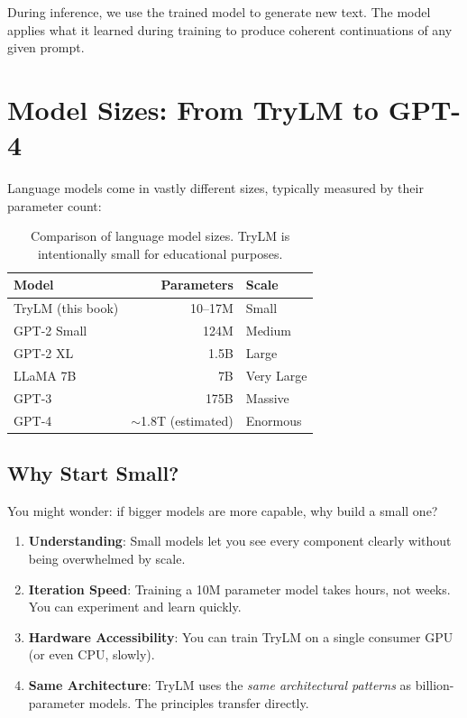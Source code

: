 During inference, we use the trained model to generate new text. The model applies what it learned during training to produce coherent continuations of any given prompt.

\section{Model Sizes: From TryLM to GPT-4}

Language models come in vastly different sizes, typically measured by their parameter count:

\begin{table}[H]
\centering
\begin{tabular}{lrl}
\toprule
\textbf{Model} & \textbf{Parameters} & \textbf{Scale} \\
\midrule
TryLM (this book) & 10--17M & Small \\
GPT-2 Small & 124M & Medium \\
GPT-2 XL & 1.5B & Large \\
LLaMA 7B & 7B & Very Large \\
GPT-3 & 175B & Massive \\
GPT-4 & $\sim$1.8T (estimated) & Enormous \\
\bottomrule
\end{tabular}
\caption{Comparison of language model sizes. TryLM is intentionally small for educational purposes.}
\label{tab:model-sizes}
\end{table}

\subsection{Why Start Small?}

You might wonder: if bigger models are more capable, why build a small one?

\begin{enumerate}
    \item \textbf{Understanding}: Small models let you see every component clearly without being overwhelmed by scale.

    \item \textbf{Iteration Speed}: Training a 10M parameter model takes hours, not weeks. You can experiment and learn quickly.

    \item \textbf{Hardware Accessibility}: You can train TryLM on a single consumer GPU (or even CPU, slowly).

    \item \textbf{Same Architecture}: TryLM uses the \textit{same architectural patterns} as billion-parameter models. The principles transfer directly.
\end{enumerate}

